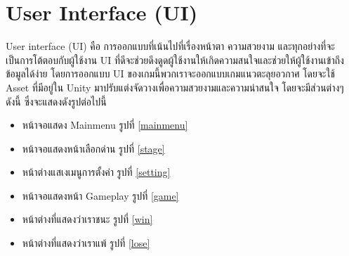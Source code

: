 \section{User Interface (UI)}
User interface (UI) คือ การออกแบบที่เน้นไปที่เรื่องหน้าตา ความสวยงาม และทุกอย่างที่จะเป็นการโต้ตอบกับผู้ใช้งาน UI ที่ดีจะช่วยดึงดูดผู้ใช้งานให้เกิดความสนใจและช่วยให้ผู้ใช้งานเข้าถึงข้อมูลได้ง่าย
โดยการออกแบบ UI ของเกมนี้พวกเราจะออกแบบเกมแนวตะลุยอวกาศ โดยจะใช้ Asset ที่มีอยู่ใน Unity มาปรับแต่งจัดวางเพื่อความสวยงามและความน่าสนใจ โดยจะมีส่วนต่างๆ ดังนี้ ซึ่งจะแสดงดังรูปต่อไปนี้
\begin{itemize}
\item หน้าจอแสดง Mainmenu รูปที่ \ref{mainmenu}
\item หน้าจอแสดงหน้าเลือกด่าน รูปที่ \ref{stage}
\item หน้าต่างแสเงเมนูการตั้งค่า รูปที่ \ref{setting}
\item หน้าจอแสดงหน้า Gameplay รูปที่ \ref{game}
\item หน้าต่างที่แสดงว่าเราชนะ รูปที่ \ref{win}
\item หน้าต่างที่แสดงว่าเราแพ้ รูปที่ \ref{lose}
\end{itemize}


